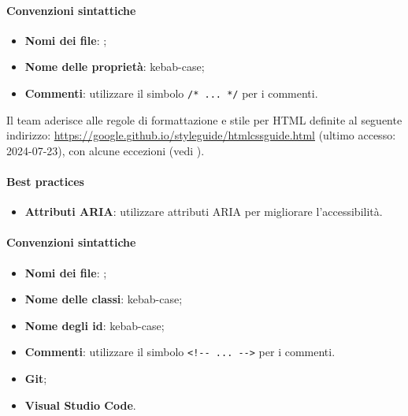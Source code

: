 \paragraph*{Convenzioni sintattiche}
\begin{itemize}
  \item \textbf{Nomi dei file}: ;
  \item \textbf{Nome delle proprietà}: kebab-case;
  \item \textbf{Commenti}: utilizzare il simbolo \verb|/* ... */| per i commenti.
\end{itemize}

\par Il team aderisce alle regole di formattazione e stile per HTML definite al seguente indirizzo: \href{https://google.github.io/styleguide/htmlcssguide.html}{https://google.github.io/styleguide/htmlcssguide.html} (ultimo accesso: 2024-07-23), con alcune eccezioni (vedi ).

\paragraph*{Best practices}
\begin{itemize}
  \item \textbf{Attributi ARIA}: utilizzare attributi ARIA per migliorare l'accessibilità.
\end{itemize}

\paragraph*{Convenzioni sintattiche}
\begin{itemize}
  \item \textbf{Nomi dei file}: ;
  \item \textbf{Nome delle classi}: kebab-case;
  \item \textbf{Nome degli id}: kebab-case;
  \item \textbf{Commenti}: utilizzare il simbolo \verb|<!-- ... -->| per i commenti.
\end{itemize}

\begin{itemize}
  \item \textbf{Git};
  \item \textbf{Visual Studio Code}.
\end{itemize}

